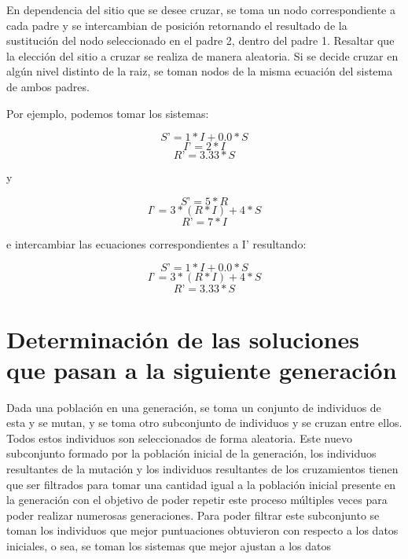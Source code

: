 En dependencia del sitio que se desee cruzar, se toma un nodo correspondiente a cada padre y se intercambian de posición retornando el resultado de la sustitución del nodo seleccionado en el padre 2, dentro del padre 1. Resaltar que la elección del sitio a cruzar se realiza de manera aleatoria. Si se decide cruzar en algún nivel distinto de la raiz, se toman nodos de la misma ecuación del sistema de ambos padres.

Por ejemplo, podemos tomar los sistemas:

$$S’ = 1 * I + 0.0 * S$$
$$I’ = 2 * I$$
$$R’ = 3.33 * S$$

y

$$S’ = 5 * R$$
$$I’ = 3 * (R * I) + 4 * S$$
$$R’ = 7 * I$$

e intercambiar las ecuaciones correspondientes a I’ resultando:

$$S’ = 1 * I + 0.0 * S$$
$$I’ = 3 * (R * I) + 4 * S$$
$$R’ = 3.33 * S$$

\section{Determinación de las soluciones que pasan a la siguiente generación}

Dada una población en una generación, se toma un conjunto de individuos de esta y se mutan, y se toma otro subconjunto de individuos y se cruzan entre ellos. Todos estos individuos son seleccionados de forma aleatoria. Este nuevo subconjunto formado por la población inicial de la generación, los individuos resultantes de la mutación y los individuos resultantes de los cruzamientos tienen que ser filtrados para tomar una cantidad igual a la población inicial presente en la generación con el objetivo de poder repetir este proceso múltiples veces para poder realizar numerosas generaciones. Para poder filtrar este subconjunto se toman los individuos que mejor puntuaciones obtuvieron con respecto a los datos iniciales, o sea, se toman los sistemas que mejor ajustan a los datos